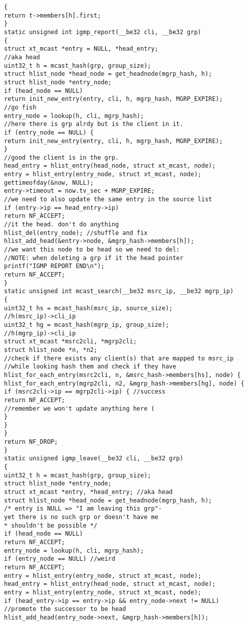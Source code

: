 \begin{verbatim}
{
return t->members[h].first;
}
static unsigned int igmp_report(__be32 cli, __be32 grp)
{
struct xt_mcast *entry = NULL, *head_entry;
//aka head
uint32_t h = mcast_hash(grp, group_size);
struct hlist_node *head_node = get_headnode(mgrp_hash, h);
struct hlist_node *entry_node;
if (head_node == NULL)
return init_new_entry(entry, cli, h, mgrp_hash, MGRP_EXPIRE);
//go fish
entry_node = lookup(h, cli, mgrp_hash);
//here there is grp alrdy but is the client in it.
if (entry_node == NULL) {
return init_new_entry(entry, cli, h, mgrp_hash, MGRP_EXPIRE);
}
//good the client is in the grp.
head_entry = hlist_entry(head_node, struct xt_mcast, node);
entry = hlist_entry(entry_node, struct xt_mcast, node);
gettimeofday(&now, NULL);
entry->timeout = now.tv_sec + MGRP_EXPIRE;
//we need to also update the same entry in the source list
if (entry->ip == head_entry->ip)
return NF_ACCEPT;
//it the head. don't do anything
hlist_del(entry_node); //shuffle and fix
hlist_add_head(&entry->node, &mgrp_hash->members[h]);
//we want this node to be head so we need to del:
//NOTE: when deleting a grp if it the head pointer
printf("IGMP REPORT END\n");
return NF_ACCEPT;
}
static unsigned int mcast_search(__be32 msrc_ip, __be32 mgrp_ip)
{
uint32_t hs = mcast_hash(msrc_ip, source_size);
//h(msrc_ip)->cli_ip
uint32_t hg = mcast_hash(mgrp_ip, group_size);
//h(mgrp_ip)->cli_ip
struct xt_mcast *msrc2cli, *mgrp2cli;
struct hlist_node *n, *n2;
//check if there exists any client(s) that are mapped to msrc_ip
//while looking hash them and check if they have
hlist_for_each_entry(msrc2cli, n, &msrc_hash->members[hs], node) {
hlist_for_each_entry(mgrp2cli, n2, &mgrp_hash->members[hg], node) {
if (msrc2cli->ip == mgrp2cli->ip) { //success
return NF_ACCEPT;
//remember we won't update anything here (
}
}
}
return NF_DROP;
}
static unsigned igmp_leave(__be32 cli, __be32 grp)
{
uint32_t h = mcast_hash(grp, group_size);
struct hlist_node *entry_node;
struct xt_mcast *entry, *head_entry; //aka head
struct hlist_node *head_node = get_headnode(mgrp_hash, h);
/* entry is NULL => "I am leaving this grp"-
yet there is no such grp or doesn't have me
* shouldn't be possible */
if (head_node == NULL)
return NF_ACCEPT;
entry_node = lookup(h, cli, mgrp_hash);
if (entry_node == NULL) //weird
return NF_ACCEPT;
entry = hlist_entry(entry_node, struct xt_mcast, node);
head_entry = hlist_entry(head_node, struct xt_mcast, node);
entry = hlist_entry(entry_node, struct xt_mcast, node);
if (head_entry->ip == entry->ip && entry_node->next != NULL)
//promote the successor to be head
hlist_add_head(entry_node->next, &mgrp_hash->members[h]);

\end{verbatim}
